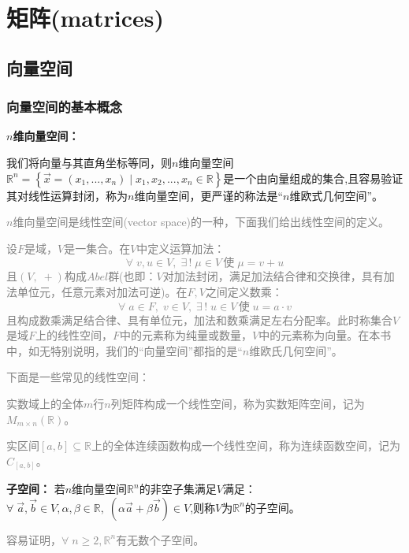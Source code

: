 \documentclass[zihao=-4,UTF8]{report}
\begin{document}
\chapter{矩阵(matrices)}
\thispagestyle{fancy} 
\section{向量空间}
\subsection{向量空间的基本概念}

\textbf{$n$维向量空间：}\par
我们将向量与其直角坐标等同，则$n$维向量空间$ \mathbb{R}^{n}=\left \{\vec{x}= (x_{1},...,x_{n})\;|\;x_{1},x_{2},...,x_{n}\in \mathbb{R} \right \} $是一个由向量组成的集合,且容易验证其对线性运算封闭，称为$n$维向量空间，更严谨的称法是“$n$维欧式几何空间”。\par
\textcolor{gray}{$n$维向量空间是线性空间(vector space)的一种，下面我们给出线性空间的定义。}\par
\textcolor{gray}{
设$F$是域，$V$是一集合。在$V$中定义运算加法：
\begin{equation*}
    \forall \;v,u\in V,\;\exists\,!\; \mu \in V \,\text{使}\;\mu = v+u 
\end{equation*}
\indent 且$(V,\;+)$构成$Abel$群(也即：$V$对加法封闭，满足加法结合律和交换律，具有加法单位元，任意元素对加法可逆)。在$F,V$之间定义数乘：
\begin{equation*}
    \forall \;a\in F,\;v \in V,\;\exists\,!\; u \in V \,\text{使}\;u = a\cdot v 
\end{equation*}
\indent 且构成数乘满足结合律、具有单位元，加法和数乘满足左右分配率。此时称集合$V$是域$F$上的线性空间，$F$中的元素称为纯量或数量，$V$中的元素称为向量。在本书中，如无特别说明，我们的“向量空间”都指的是“$n$维欧氏几何空间”。}\par
\textcolor{gray}{下面是一些常见的线性空间：}\par
\textcolor{gray}{实数域上的全体$m$行$n$列矩阵构成一个线性空间，称为实数矩阵空间，记为$M_{m\times n}(\mathbb{R}) $。}\par
\textcolor{gray}{实区间$\left[a,b\right]\subseteq \mathbb{R}$上的全体连续函数构成一个线性空间，称为连续函数空间，记为$C_{\left[a,b\right]}$。}

\textbf{子空间：}
若$n$维向量空间$ \mathbb{R}^{n}$的非空子集满足$V$满足：$\forall \;\vec{a},\vec{b}\in V,\alpha ,\beta \in \mathbb{R},\; (\alpha  \vec{a}+\beta\vec{b})\in V  $,则称$V$为$ \mathbb{R}^{n}$的子空间。\par
\textcolor{gray}{容易证明，$\forall\;n\ge2,\mathbb{R}^{n}$有无数个子空间。}
\end{document}

